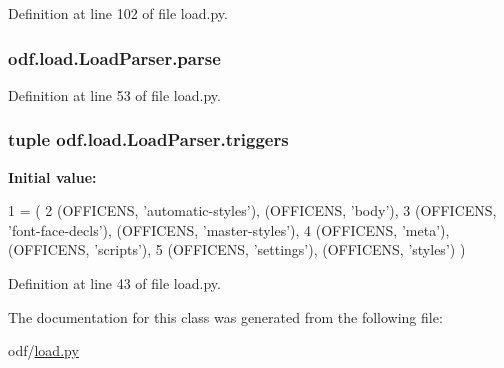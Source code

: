 Definition at line 102 of file load.\+py.

\hypertarget{classodf_1_1load_1_1LoadParser_a668b4b320572d932c8a28912e2475421}{
\subsubsection[{parse}]{\setlength{\rightskip}{0pt plus 5cm}odf.\+load.\+Load\+Parser.\+parse}}\label{classodf_1_1load_1_1LoadParser_a668b4b320572d932c8a28912e2475421}


Definition at line 53 of file load.\+py.

\hypertarget{classodf_1_1load_1_1LoadParser_aca293bdcaeb301d095bee36245246d2a}{
\subsubsection[{triggers}]{\setlength{\rightskip}{0pt plus 5cm}tuple odf.\+load.\+Load\+Parser.\+triggers\hspace{0.3cm}{\ttfamily [static]}}}\label{classodf_1_1load_1_1LoadParser_aca293bdcaeb301d095bee36245246d2a}
{\bfseries Initial value\+:}
\begin{DoxyCode}
1 = (
2        (OFFICENS, \textcolor{stringliteral}{'automatic-styles'}), (OFFICENS, \textcolor{stringliteral}{'body'}),
3        (OFFICENS, \textcolor{stringliteral}{'font-face-decls'}), (OFFICENS, \textcolor{stringliteral}{'master-styles'}),
4        (OFFICENS, \textcolor{stringliteral}{'meta'}), (OFFICENS, \textcolor{stringliteral}{'scripts'}),
5        (OFFICENS, \textcolor{stringliteral}{'settings'}), (OFFICENS, \textcolor{stringliteral}{'styles'}) )
\end{DoxyCode}


Definition at line 43 of file load.\+py.



The documentation for this class was generated from the following file\+:\begin{DoxyCompactItemize}
\item 
odf/\hyperlink{load_8py}{load.\+py}\end{DoxyCompactItemize}
